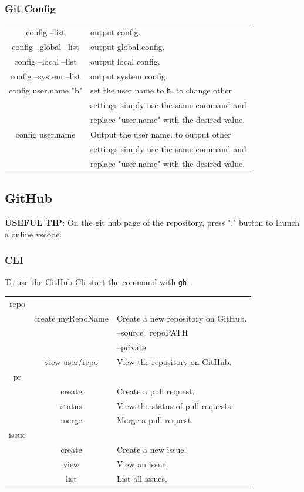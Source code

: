 \documentclass[10pt]{article}
\begin{document}
\begin{multicols}{2}
\subsubsection{Git Config}
\begin{tabular}{C L}
  config --list           & output config.\\
  config --global --list  & output global config.\\
  config --local --list   & output local config.\\
  config --system --list  & output system config.\\
  config user.name "b"    & set the user name to \texttt{b}. to change other\\
                              & settings simply use the same command and\\
                              & replace "user.name" with the desired value.\\
  config user.name        & Output the user name. to output other\\
                              & settings simply use the same command and\\
                              & replace "user.name" with the desired value.\\
\end{tabular}

\subsection{GitHub}
\textbf{USEFUL TIP:} On the git hub page of the repository, press "." button to launch a online vscode. \\
\subsubsection{CLI}
To use the GitHub Cli start the command with \texttt{gh}.
\begin{tabular}{C C L}
  repo & \\
       & create myRepoName   & Create a new repository on GitHub.\\
       &                     & --source=repoPATH\\
       &                     & --private\\
       & view user/repo      & View the repository on GitHub.\\
  pr   &\\
       & create              & Create a pull request.\\
       & status              & View the status of pull requests.\\
       & merge               & Merge a pull request.\\
  issue&\\
       & create              & Create a new issue.\\
       & view                & View an issue.\\
       & list                & List all issues.\\
  \end{tabular}

\end{multicols}
\end{document}
